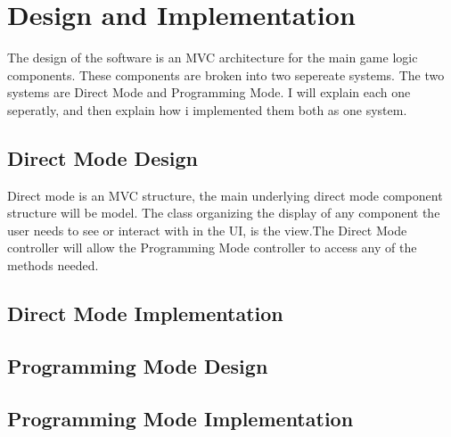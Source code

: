 \chapter{Design and Implementation}

The design of the software is an MVC architecture for the main game logic components. These components are broken into two sepereate systems. The two systems are Direct Mode and Programming Mode. I will explain each one seperatly, and then explain how i implemented them both as one system. 



\section{Direct Mode Design}

Direct mode is an MVC structure, the main underlying direct mode component structure will be model. The class organizing the display of any component the user needs to see or interact with in the UI, is the view.The Direct Mode controller will allow the Programming Mode controller to access any of the methods needed. 



\section{Direct Mode Implementation}


\section{Programming Mode Design}


\section{Programming Mode Implementation}